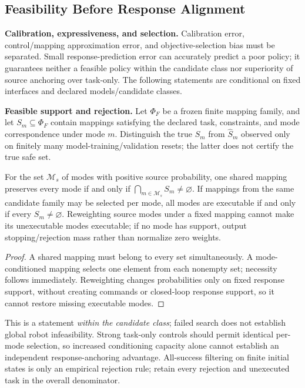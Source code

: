 \subsection{Feasibility Before Response Alignment}
\label{sec:finite-feasibility}
\textbf{Calibration, expressiveness, and selection.} Calibration error, control/mapping approximation error,
and objective-selection bias must be separated. Small response-prediction error can accurately predict a poor policy;
it guarantees neither a feasible policy within the candidate class nor superiority of source anchoring over task-only.
The following statements are conditional on fixed interfaces and declared models/candidate classes.

\textbf{Feasible support and rejection.} Let $\Phi_F$ be a frozen finite mapping family,
and let $S_m\subseteq\Phi_F$ contain mappings satisfying the declared task, constraints, and mode correspondence under mode $m$.
Distinguish the true $S_m$ from $\widehat S_m$ observed only on finitely many model-training/validation resets;
the latter does not certify the true safe set.
\begin{proposition}
For the set $\mathcal M_s$ of modes with positive source probability, one shared mapping preserves every mode
if and only if $\bigcap_{m\in\mathcal M_s}S_m\ne\varnothing$.
If mappings from the same candidate family may be selected per mode, all modes are executable if and only if every
$S_m\ne\varnothing$. Reweighting source modes under a fixed mapping cannot make its unexecutable modes
executable; if no mode has support, output stopping/rejection mass rather than normalize zero weights.
\end{proposition}
\begin{proof}
A shared mapping must belong to every set simultaneously. A mode-conditioned mapping selects one element from each nonempty set;
necessity follows immediately. Reweighting changes probabilities only on fixed response support, without creating commands or
closed-loop response support, so it cannot restore missing executable modes.
\end{proof}
This is a statement \emph{within the candidate class}; failed search does not establish global robot infeasibility.
Strong task-only controls should permit identical per-mode selection, so increased conditioning capacity alone cannot
establish an independent response-anchoring advantage. All-success filtering on finite initial states is only an empirical
rejection rule; retain every rejection and unexecuted task in the overall denominator.

